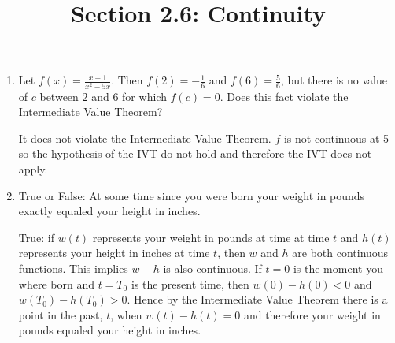 \documentclass[nooutcomes,handout]{ximera}
\title{Section 2.6: Continuity}
\begin{document}
\begin{abstract}		\end{abstract}
\maketitle

\begin{problem}
	\begin{enumerate}
   	\item  Let $f(x) = \frac{x-1}{x^2 - 5x}$.  Then $f(2)=-\frac{1}{6}$ and $f(6)=\frac{5}{6}$, but there is no value of $c$ between $2$ and $6$ for which $f(c)=0$.  Does this fact violate the Intermediate Value Theorem?

      \begin{freeResponse}
        It does not violate the Intermediate Value Theorem.  $f$ is not continuous at 5 so the hypothesis of the IVT do not hold and therefore the IVT does not apply.
      \end{freeResponse}

	\item	True or False: At some time since you were born your weight in pounds exactly equaled your height in inches.
      \begin{freeResponse}
        True: if $w(t)$ represents your weight in pounds at time at time $t$ and $h(t)$ represents your height in inches at time $t$, then $w$ and $h$ are both continuous functions.  This implies $w - h$ is also continuous.
        If $t = 0$ is the moment you where born and $t = T_0$ is the present time, then $w(0) - h(0) < 0$ and $w(T_0) - h(T_0) > 0$.
        Hence by the Intermediate Value Theorem there is a point in the past, $t$, when $w(t)-h(t)=0$ and therefore your weight in pounds equaled your height in inches.
      \end{freeResponse}
	
	\end{enumerate}

\end{problem}
\end{document}
